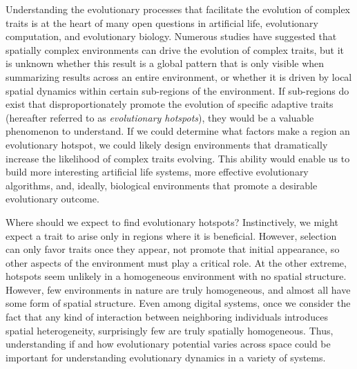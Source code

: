 \documentclass[letterpaper]{article}
\begin{document}
Understanding the evolutionary processes that facilitate the evolution of complex traits is at the heart of many open questions in artificial life, evolutionary computation, and evolutionary biology. Numerous studies have suggested that spatially complex environments can drive the evolution of complex traits, but it is unknown whether this result is a global pattern that is only visible when summarizing results across an entire environment, 
or whether it is driven by local spatial dynamics within certain sub-regions of the environment. If sub-regions do exist that disproportionately promote the evolution of specific adaptive traits (hereafter referred to as \textit{evolutionary hotspots}), they would be a valuable phenomenon to understand. If we could determine what factors make a region an evolutionary hotspot, we could likely design environments that dramatically increase the likelihood of complex traits evolving. This ability would enable us to build more interesting artificial life systems, more effective evolutionary algorithms, and, ideally, biological environments that promote a desirable evolutionary outcome.

Where should we expect to find evolutionary hotspots? Instinctively, we might expect a trait to arise only in regions where it is beneficial. However, selection can only favor traits once they appear, not promote that initial appearance, so other aspects of the environment must play a critical role.  At the other extreme, hotspots seem unlikely in a homogeneous environment with no spatial structure.
However, few environments in nature are truly homogeneous, and almost all have some form of spatial structure. Even among digital systems, once we consider the fact that any kind of interaction between neighboring individuals introduces spatial heterogeneity, surprisingly few are truly spatially homogeneous. Thus, understanding if and how evolutionary potential varies across space could be important for understanding evolutionary dynamics in a variety of systems.
\end{document}
